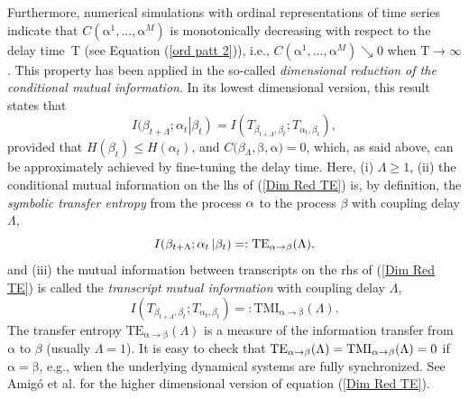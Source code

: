 \documentclass[%
 aip,
 amsmath,amssymb,
 reprint,%
]{revtex4-1}
\begin{document}
Furthermore, numerical simulations \cite{Monetti2013B} with ordinal
representations of time series indicate that $C(\mathrm{\alpha }^{1},...,%
\mathrm{\alpha }^{M})$ is monotonically decreasing with respect to the delay
time\ \textrm{T} (see Equation (\ref{ord patt 2})), i.e., $C(\mathrm{\alpha }%
^{1},...,\mathrm{\alpha }^{M})\searrow 0$ when $\mathrm{T}\rightarrow \infty 
$. This property has been applied in the so-called \textit{dimensional
reduction of the conditional mutual information}. In its lowest dimensional
version, this result states that 
\begin{equation}
I(\beta _{t+\Lambda };\alpha _{t}\left\vert \beta _{t}\right) =I(T_{\beta
_{t+\Lambda },\beta _{t}};T_{\alpha _{t},\beta _{t}}),  \label{Dim Red TE}
\end{equation}%
provided that $H(\beta _{t})\leq H(\alpha _{t})$, and $C($\textrm{$\beta $}$%
_{\Lambda },\mathrm{\beta },\mathrm{\alpha })=0$, which, as said above, can
be approximately achieved by fine-tuning the delay time. Here, (i) $\Lambda\geq 1$,  (ii) the conditional mutual
information on the lhs of (\ref{Dim Red TE}) is, by definition, the \textit{%
symbolic transfer entropy} \cite{Staniek2008} from the process $\mathrm{%
\alpha }$ to the process \textrm{$\beta $} with coupling delay $\Lambda $, 
\begin{equation}
I(\beta _{t+\Lambda };\alpha _{t}\left\vert \beta _{t}\right) =:\mathrm{TE}_{%
\mathrm{\alpha }\rightarrow \mathrm{\beta }}(\Lambda ),  \label{TE}
\end{equation}%
and (iii) the mutual information between transcripts on the rhs of (\ref{Dim
Red TE}) is called the \textit{transcript mutual information}
with coupling delay $\Lambda $, 
\begin{equation}
I(T_{\beta _{t+\Lambda },\beta _{t}};T_{\alpha _{t},\beta _{t}})=:\mathrm{TMI%
}_{\mathrm{\alpha }\rightarrow \mathrm{\beta }}(\Lambda ).  \label{TMI}
\end{equation}%
The transfer entropy $\mathrm{TE}_{\mathrm{\alpha }\rightarrow \mathrm{\beta }}(\Lambda )$ is a
measure of the information transfer from $\mathrm{\alpha }$ to \textrm{$%
\beta $} (usually $\Lambda =1$). It is easy to check that $\mathrm{TE}_{%
\mathrm{\alpha }\rightarrow \mathrm{\beta }}(\Lambda )=\mathrm{TMI}_{\mathrm{%
\alpha }\rightarrow \mathrm{\beta }}(\Lambda )=0$ if $\mathrm{\alpha }=%
\mathrm{\beta }$, e.g., when the underlying dynamical systems are fully
synchronized. See Amig\'{o} et al. \cite{Amigo2016} for the higher
dimensional version of equation (\ref{Dim Red TE}).
\end{document}
